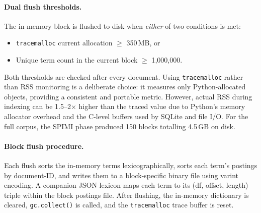 \documentclass[sigconf,nonacm]{acmart}
\begin{document}
\paragraph{Dual flush thresholds.}
The in-memory block is flushed to disk when \emph{either} of two conditions is
met:
\begin{itemize}[nosep]
  \item \texttt{tracemalloc} current allocation $\geq$ 350\,MB, or
  \item Unique term count in the current block $\geq$ 1{,}000{,}000.
\end{itemize}
Both thresholds are checked after every document.  Using \texttt{tracemalloc}
rather than RSS monitoring is a deliberate choice: it measures only
Python-allocated objects, providing a consistent and portable metric.  However,
actual RSS during indexing can be 1.5--2$\times$ higher than the traced value
due to Python's memory allocator overhead and the C-level buffers used by
SQLite and file I/O.  For the full corpus, the SPIMI phase produced 150 blocks
totalling 4.5\,GB on disk.

\paragraph{Block flush procedure.}
Each flush sorts the in-memory terms lexicographically, sorts each
term's postings by document-ID, and writes them to a block-specific
binary file using varint encoding.  A companion JSON lexicon maps each
term to its (df, offset, length) triple within the block postings file.
After flushing, the in-memory dictionary is cleared,
\texttt{gc.collect()} is called, and the \texttt{tracemalloc} trace
buffer is reset.
\end{document}
